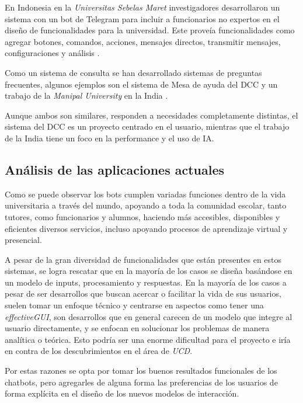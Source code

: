     \par En Indonesia en la \textit{Universitas Sebelas Maret} investigadores desarrollaron un sistema con un bot de Telegram para incluir a funcionarios no expertos en el diseño de funcionalidades para la universidad. Este proveía funcionalidades como agregar botones, comandos, acciones, mensajes directos, transmitir mensajes, configuraciones y análisis \cite{Hasyim_2021}.
    
    \par Como un sistema de consulta se han desarrollado sistemas de preguntas frecuentes, algunos ejemplos son el sistema de Mesa de ayuda del DCC \cite{ARANCIBIA2021} y un trabajo de la \textit{Manipal University} en la India \cite{Ranoliya2017}.
    \par Aunque ambos son similares, responden a necesidades completamente distintas, el sistema del DCC es un proyecto centrado en el usuario, mientras que el trabajo de la India tiene un foco en la performance y el uso de IA.
    
    \subsection{Análisis de las aplicaciones actuales}
    \par Como se puede observar los bots cumplen variadas funciones dentro de la vida universitaria a través del mundo, apoyando a toda la comunidad escolar, tanto tutores, como funcionarios y alumnos, haciendo más accesibles, disponibles y eficientes diversos servicios, incluso apoyando procesos de aprendizaje virtual y presencial.
    \par A pesar de la gran diversidad de funcionalidades que están presentes en estos sistemas, se logra rescatar que en la mayoría de los casos se diseña basándose en un modelo de inputs, procesamiento y respuestas. En la mayoría de los casos a pesar de ser desarrollos que buscan acercar o facilitar la vida de sus usuarios, suelen tomar un enfoque técnico y centrarse en aspectos como tener una \textit{\acrshort{effectiveGUI}}, son desarrollos que en general carecen de un modelo que integre al usuario directamente, y se enfocan en solucionar los problemas de manera analítica o teórica. Esto podría ser una enorme dificultad para el proyecto e iría en contra de los descubrimientos en el área de \textit{\acrlong{UCD}}.
    \par Por estas razones se opta por tomar los buenos resultados funcionales de los chatbots, pero agregarles de alguna forma las preferencias de los usuarios de forma explícita en el diseño de los nuevos modelos de interacción.

